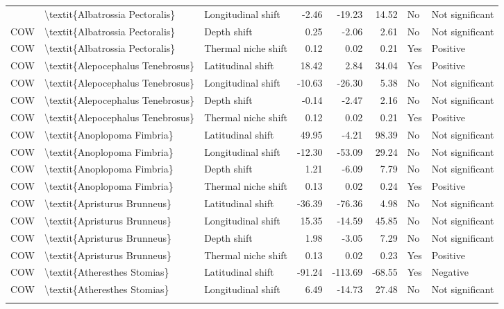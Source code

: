 \begin{longtable}[t]{lllrrrll}
{{COW & \textbackslash{}textit\{Albatrossia Pectoralis\} & Longitudinal shift & -2.46 & -19.23 & 14.52 & No & Not significant\\
COW & \textbackslash{}textit\{Albatrossia Pectoralis\} & Depth shift & 0.25 & -2.06 & 2.61 & No & Not significant\\
COW & \textbackslash{}textit\{Albatrossia Pectoralis\} & Thermal niche shift & 0.12 & 0.02 & 0.21 & Yes & Positive\\
\addlinespace
COW & \textbackslash{}textit\{Alepocephalus Tenebrosus\} & Latitudinal shift & 18.42 & 2.84 & 34.04 & Yes & Positive\\
COW & \textbackslash{}textit\{Alepocephalus Tenebrosus\} & Longitudinal shift & -10.63 & -26.30 & 5.38 & No & Not significant\\
COW & \textbackslash{}textit\{Alepocephalus Tenebrosus\} & Depth shift & -0.14 & -2.47 & 2.16 & No & Not significant\\
COW & \textbackslash{}textit\{Alepocephalus Tenebrosus\} & Thermal niche shift & 0.12 & 0.02 & 0.21 & Yes & Positive\\
COW & \textbackslash{}textit\{Anoplopoma Fimbria\} & Latitudinal shift & 49.95 & -4.21 & 98.39 & No & Not significant\\
\addlinespace
COW & \textbackslash{}textit\{Anoplopoma Fimbria\} & Longitudinal shift & -12.30 & -53.09 & 29.24 & No & Not significant\\
COW & \textbackslash{}textit\{Anoplopoma Fimbria\} & Depth shift & 1.21 & -6.09 & 7.79 & No & Not significant\\
COW & \textbackslash{}textit\{Anoplopoma Fimbria\} & Thermal niche shift & 0.13 & 0.02 & 0.24 & Yes & Positive\\
COW & \textbackslash{}textit\{Apristurus Brunneus\} & Latitudinal shift & -36.39 & -76.36 & 4.98 & No & Not significant\\
COW & \textbackslash{}textit\{Apristurus Brunneus\} & Longitudinal shift & 15.35 & -14.59 & 45.85 & No & Not significant\\
\addlinespace
COW & \textbackslash{}textit\{Apristurus Brunneus\} & Depth shift & 1.98 & -3.05 & 7.29 & No & Not significant\\
COW & \textbackslash{}textit\{Apristurus Brunneus\} & Thermal niche shift & 0.13 & 0.02 & 0.23 & Yes & Positive\\
COW & \textbackslash{}textit\{Atheresthes Stomias\} & Latitudinal shift & -91.24 & -113.69 & -68.55 & Yes & Negative\\
COW & \textbackslash{}textit\{Atheresthes Stomias\} & Longitudinal shift & 6.49 & -14.73 & 27.48 & No & Not significant\\
}}
\end{longtable}
